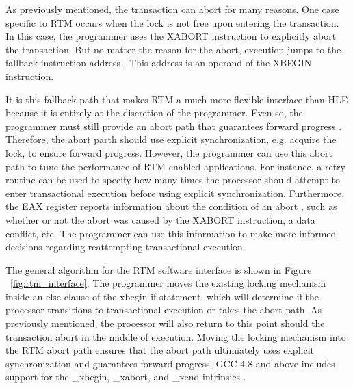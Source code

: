 \documentclass[a4paper]{article}
\begin{document}
\indent
As previously mentioned, the transaction can abort for many reasons.
One case specific to RTM occurs when the lock is not free upon entering the
transaction.  In this case, the programmer uses the XABORT instruction to
explicitly abort the transaction.  But no matter the reason for the abort,
execution jumps to the fallback instruction address \cite{intel_prog_ref}.  This
address is an operand of the XBEGIN instruction.
\par

\indent
It is this fallback path that makes RTM a much more flexible interface
than HLE because it is entirely at the discretion of the programmer.  Even so,
the programmer must still provide an abort path that guarantees forward progress
\cite{intel_prog_ref}.  Therefore, the abort parth should use explicit
synchronization, e.g. acquire the lock, to ensure forward progress. However, the
programmer can use this abort path to tune the performance of RTM enabled
applications.  For instance, a retry routine can be used to specify how many
times the processor should attempt to enter transactional execution before using
explicit synchronization.  Furthermore, the EAX register reports information
about the condition of an abort \cite{intel_prog_ref}, such as whether or not
the abort was caused by the XABORT instruction, a data conflict, etc.  The
programmer can use this information to make more informed decisions regarding
reattempting transactional execution.
\par

\indent 
The general algorithm for the RTM software interface is shown in Figure
~\ref{fig:rtm_interface}.  The programmer moves the existing locking mechanism
inside an else clause of the xbegin if statement, which will determine if the
processor transitions to transactional execution or takes the abort path.  As
previously mentioned, the processor will also return to this point should the
transaction abort in the middle of execution. Moving the locking mechanism into
the RTM abort path ensures that the abort path ultimiately uses explicit
synchronization and guarantees forward progress.  GCC 4.8 and above includes
support for the \_xbegin, \_xabort, and \_xend intrinsics \cite{gcc}.
\end{document}

